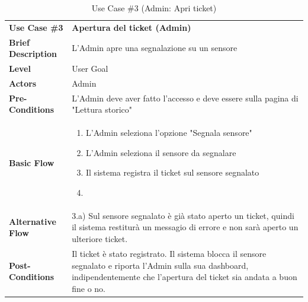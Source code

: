 \documentclass[a4paper, 11pt]{article}
\begin{document}
	\begin{table}[h]
		\centering
		\setlength{\arrayrulewidth}{0.8pt} %

		\begin{tabular}{|l p{12cm}|}
			\hline

			\rowcolor{gray!25}
			\textbf{Use Case \#3} & \textbf{Apertura del ticket (Admin)} \\
			\textbf{Brief Description} & L'Admin apre una segnalazione su un sensore \\
			\textbf{Level} & User Goal\\
			\textbf{Actors} & Admin \\
			\textbf{Pre-Conditions} & L'Admin deve aver fatto l'accesso e deve essere sulla pagina di "Lettura storico" \\
			\textbf{Basic Flow} & \begin{enumerate}[label=\arabic*), leftmargin=*, before=\vspace{-0.7cm}, after=\vspace{-0.4cm}]
									  \item L'Admin seleziona l'opzione "Segnala sensore"
									  \item L'Admin seleziona il sensore da segnalare
									  \item Il sistema registra il ticket sul sensore segnalato
									  \item[]
			\end{enumerate} \\
			\textbf{Alternative Flow} & 3.a) Sul sensore segnalato è già stato aperto un ticket, quindi il sistema restiturà un messagio di errore e non sarà aperto un ulteriore ticket. \\
			\textbf{Post-Conditions} & Il ticket è stato registrato. Il sistema blocca il sensore segnalato e riporta l'Admin sulla sua dashboard, indipendentemente che l'apertura del ticket sia andata a buon fine o no. \\

			\hline
		\end{tabular}

		\vspace{0.2cm}
		\caption{Use Case \#3 (Admin: Apri ticket)}
	\end{table}
	\vspace{1cm}
\end{document}
